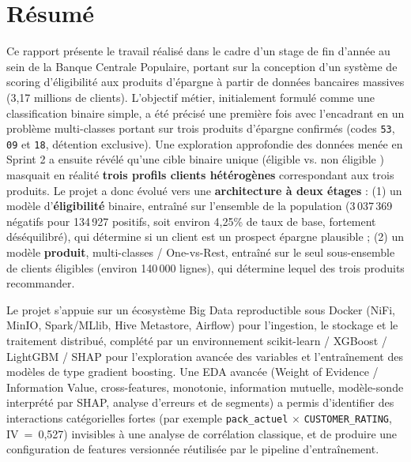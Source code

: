 \documentclass[11pt,a4paper]{report}
\begin{document}
\chapter*{Résumé}
Ce rapport présente le travail réalisé dans le cadre d'un stage de fin
d'année au sein de la Banque Centrale Populaire, portant sur la conception
d'un système de scoring d'éligibilité aux produits d'épargne à partir de
données bancaires massives (3,17 millions de clients). L'objectif métier,
initialement formulé comme une classification binaire simple, a été précisé
une première fois avec l'encadrant en un problème multi-classes portant sur
trois produits d'épargne confirmés (codes \texttt{53}, \texttt{09} et
\texttt{18}, détention exclusive). Une exploration approfondie des données
menée en Sprint 2 a ensuite révélé qu'une cible binaire unique
(\og éligible \fg{} vs. \og non éligible \fg) masquait en réalité
\textbf{trois profils clients hétérogènes} correspondant aux trois
produits. Le projet a donc évolué vers une \textbf{architecture à deux
étages} : (1) un modèle d'\textbf{éligibilité} binaire, entraîné sur
l'ensemble de la population (3\,037\,369 négatifs pour 134\,927 positifs,
soit environ 4,25\% de taux de base, fortement déséquilibré), qui détermine
si un client est un prospect épargne plausible ; (2) un modèle
\textbf{produit}, multi-classes / One-vs-Rest, entraîné sur le seul
sous-ensemble de clients éligibles (environ 140\,000 lignes), qui
détermine lequel des trois produits recommander.

Le projet s'appuie sur un écosystème Big Data reproductible sous Docker
(NiFi, MinIO, Spark/MLlib, Hive Metastore, Airflow) pour l'ingestion, le
stockage et le traitement distribué, complété par un environnement
scikit-learn / XGBoost / LightGBM / SHAP pour l'exploration avancée des
variables et l'entraînement des modèles de type gradient boosting. Une EDA
avancée (Weight of Evidence / Information Value, cross-features, monotonie,
information mutuelle, modèle-sonde interprété par SHAP, analyse d'erreurs
et de segments) a permis d'identifier des interactions catégorielles fortes
(par exemple \texttt{pack\_actuel} $\times$ \texttt{CUSTOMER\_RATING},
IV~=~0,527) invisibles à une analyse de corrélation classique, et de
produire une configuration de features versionnée réutilisée par le
pipeline d'entraînement.
\end{document}
